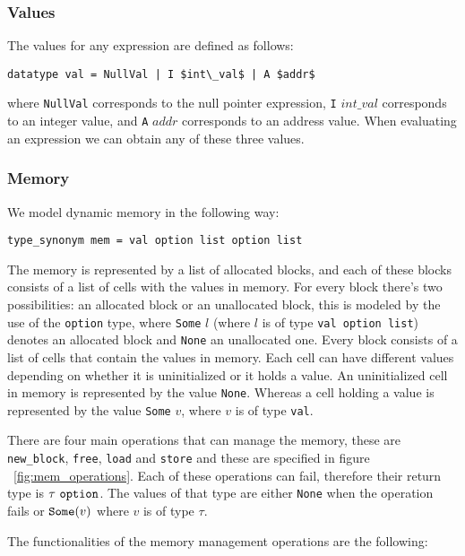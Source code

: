 \subsubsection{Values} The values for any expression are defined as follows:

\begin{lstlisting}[frame=single, mathescape=true]
datatype val = NullVal | I $int\_val$ | A $addr$
\end{lstlisting}

where \verb|NullVal| corresponds to the null pointer expression, \verb|I| $int\_val$ corresponds to an integer value, and \verb|A| $addr$ corresponds to an address value.
When evaluating an expression we can obtain any of these three values.

\subsubsection{Memory}

We model dynamic memory in the following way:

\begin{lstlisting}[frame=single, mathescape=true]
type_synonym mem = val option list option list
\end{lstlisting}

The memory is represented by a list of allocated blocks, and each of these blocks consists of a list of cells with the values in memory.
For every block there's two possibilities: an allocated block or an unallocated block, this is modeled by the use of the \verb|option| type, where \verb|Some| $l$ (where $l$ is of type \verb|val option list|) denotes an allocated block and \verb|None| an unallocated one.
Every block consists of a list of cells that contain the values in memory.
Each cell can have different values depending on whether it is uninitialized or it holds a value.
An uninitialized cell in memory is represented by the value \verb|None|.
Whereas a cell holding a value is represented by the value \verb|Some| $v$, where $v$ is of type \verb|val|.

There are four main operations that can manage the memory, these are \verb|new_block|, \verb|free|, \verb|load| and \verb|store| and these are specified in figure ~\ref{fig:mem_operations}.
Each of these operations can fail, therefore their return type is $\tau\ \verb|option|$.
The values of that type are either \verb|None| when the operation fails or $\verb|Some|(v)$ where $v$ is of type $\tau$.

The functionalities of the memory management operations are the following:

